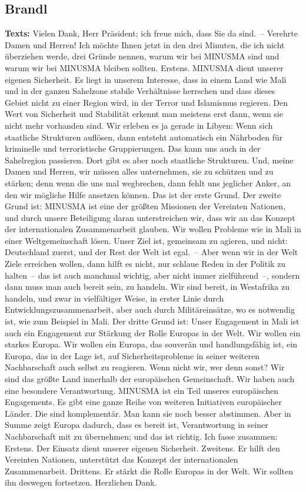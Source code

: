 \documentclass{article}
\begin{document}
\subsection{Brandl}
\noindent\textbf{Texts:} Vielen Dank, Herr Präsident; ich freue mich, dass Sie da sind. – Verehrte Damen und Herren! Ich möchte Ihnen jetzt in den drei Minuten, die ich nicht überziehen werde, drei Gründe nennen, warum wir bei MINUSMA sind und warum wir bei MINUSMA bleiben sollten. Erstens. MINUSMA dient unserer eigenen Sicherheit. Es liegt in unserem Interesse, dass in einem Land wie Mali und in der ganzen Sahelzone stabile Verhältnisse herrschen und dass dieses Gebiet nicht zu einer Region wird, in der Terror und Islamismus regieren. Den Wert von Sicherheit und Stabilität erkennt man meistens erst dann, wenn sie nicht mehr vorhanden sind. Wir erleben es ja gerade in Libyen: Wenn sich staatliche Strukturen auflösen, dann entsteht automatisch ein Nährboden für kriminelle und terroristische Gruppierungen. Das kann uns auch in der Sahelregion passieren. Dort gibt es aber noch staatliche Strukturen. Und, meine Damen und Herren, wir müssen alles unternehmen, sie zu schützen und zu stärken; denn wenn die uns mal wegbrechen, dann fehlt uns jeglicher Anker, an den wir mögliche Hilfe ansetzen können. Das ist der erste Grund. Der zweite Grund ist: MINUSMA ist eine der größten Missionen der Vereinten Nationen, und durch unsere Beteiligung daran unterstreichen wir, dass wir an das Konzept der internationalen Zusammenarbeit glauben. Wir wollen Probleme wie in Mali in einer Weltgemeinschaft lösen. Unser Ziel ist, gemeinsam zu agieren, und nicht: Deutschland zuerst, und der Rest der Welt ist egal. – Aber wenn wir in der Welt Ziele erreichen wollen, dann hilft es nicht, nur schlaue Reden in der Politik zu halten – das ist auch manchmal wichtig, aber nicht immer zielführend –, sondern dann muss man auch bereit sein, zu handeln. Wir sind bereit, in Westafrika zu handeln, und zwar in vielfältiger Weise, in erster Linie durch Entwicklungszusammenarbeit, aber auch durch Militäreinsätze, wo es notwendig ist, wie zum Beispiel in Mali. Der dritte Grund ist: Unser Engagement in Mali ist auch ein Engagement zur Stärkung der Rolle Europas in der Welt. Wir wollen ein starkes Europa. Wir wollen ein Europa, das souverän und handlungsfähig ist, ein Europa, das in der Lage ist, auf Sicherheitsprobleme in seiner weiteren Nachbarschaft auch selbst zu reagieren. Wenn nicht wir, wer denn sonst? Wir sind das größte Land innerhalb der europäischen Gemeinschaft. Wir haben auch eine besondere Verantwortung. MINUSMA ist ein Teil unseres europäischen Engagements. Es gibt eine ganze Reihe von weiteren Initiativen europäischer Länder. Die sind komplementär. Man kann sie noch besser abstimmen. Aber in Summe zeigt Europa dadurch, dass es bereit ist, Verantwortung in seiner Nachbarschaft mit zu übernehmen; und das ist richtig. Ich fasse zusammen: Erstens. Der Einsatz dient unserer eigenen Sicherheit. Zweitens. Er hilft den Vereinten Nationen, unterstützt das Konzept der internationalen Zusammenarbeit. Drittens. Er stärkt die Rolle Europas in der Welt. Wir sollten ihn deswegen fortsetzen. Herzlichen Dank. 
\end{document}
